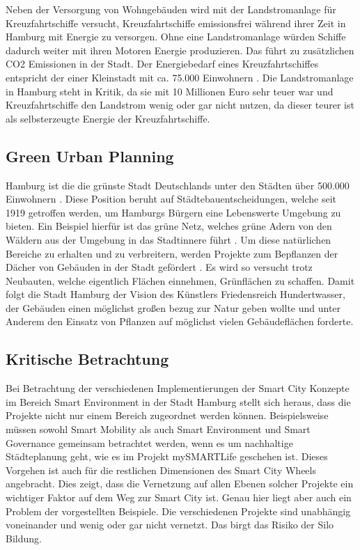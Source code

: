 Neben der Versorgung von Wohngebäuden wird mit der Landstromanlage für Kreuzfahrtschiffe versucht, Kreuzfahrtschiffe emissionsfrei während ihrer Zeit in Hamburg mit Energie zu versorgen.
Ohne eine Landstromanlage würden Schiffe dadurch weiter mit ihren Motoren Energie produzieren.
Das führt zu zusätzlichen CO2 Emissionen in der Stadt.
Der Energiebedarf eines Kreuzfahrtschiffes entspricht der einer Kleinstadt mit ca. 75.000 Einwohnern \autocite[vgl.][]{SmartCityKompass.OD}.
Die Landstromanlage in Hamburg steht in Kritik, da sie mit 10 Millionen Euro sehr teuer war und Kreuzfahrtschiffe den Landstrom wenig oder gar nicht nutzen, da dieser teurer ist als selbsterzeugte Energie der Kreuzfahrtschiffe.

\subsection{Green Urban Planning}
Hamburg ist die die grünste Stadt Deutschlands unter den Städten über 500.000 Einwohnern \autocite[vgl.][]{BerlinerMorgenpost.2016}.
Diese Position beruht auf Städtebauentscheidungen, welche seit 1919 getroffen werden, um Hamburgs Bürgern eine Lebenswerte Umgebung zu bieten. Ein Beispiel hierfür ist das grüne Netz, welches grüne Adern von den Wäldern aus der Umgebung in das Stadtinnere führt \autocite[vgl.][]{Hamburg.ODC}.
Um diese natürlichen Bereiche zu erhalten und zu verbreitern, werden Projekte zum Bepflanzen der Dächer von Gebäuden in der Stadt gefördert \autocite[vgl.][]{Hamburg.ODD}.
Es wird so versucht trotz Neubauten, welche eigentlich Flächen einnehmen, Grünflächen zu schaffen.
Damit folgt die Stadt Hamburg der Vision des Künstlers Friedensreich Hundertwasser, der Gebäuden einen möglichst großen bezug zur Natur geben wollte und unter Anderem den Einsatz von Pflanzen auf möglichst vielen Gebäudeflächen forderte.

\subsection{Kritische Betrachtung}
Bei Betrachtung der verschiedenen Implementierungen der Smart City Konzepte im Bereich Smart Environment in der Stadt Hamburg stellt sich heraus, dass die Projekte nicht nur einem Bereich zugeordnet werden können.
Beispielsweise müssen sowohl Smart Mobility als auch Smart Environment und Smart Governance gemeinsam betrachtet werden, wenn es um nachhaltige Städteplanung geht, wie es im Projekt mySMARTLife geschehen ist.
Dieses Vorgehen ist auch für die restlichen Dimensionen des Smart City Wheels angebracht.
Dies zeigt, dass die Vernetzung auf allen Ebenen solcher Projekte ein wichtiger Faktor auf dem Weg zur Smart City ist.
Genau hier liegt aber auch ein Problem der vorgestellten Beispiele.
Die verschiedenen Projekte sind unabhängig voneinander und wenig oder gar nicht vernetzt.
Das birgt das Risiko der Silo Bildung.
